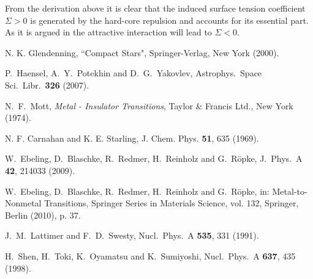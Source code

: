 \documentclass[12pt]{article}
\begin{document}
From the derivation above 
it is clear  that the induced surface tension coefficient $\Sigma > 0$ is generated by the hard-core repulsion and  accounts for its 
essential  part. As it  is argued in \cite{Bugaev:13NPA} the attractive interaction will lead to $\Sigma < 0$.


\begin{thebibliography}{99}

N. K.  Glendenning, ``Compact Stars", Springer-Verlag, New York   (2000). 


  P.~Haensel, A.~Y.~Potekhin and D.~G.~Yakovlev,
  Astrophys.\ Space Sci.\ Libr.\  {\bf 326} (2007).

N.~F.~Mott, {\it Metal - Insulator Transitions}, Taylor \& Francis Ltd., New York (1974).  

N. F. Carnahan and  K. E. Starling, J. Chem. Phys. {\bf  51}, 635  (1969).


  W.~Ebeling, D.~Blaschke, R.~Redmer, H.~Reinholz and G.~R\"opke,
  J.\ Phys.\ A {\bf 42}, 214033 (2009).

  W.~Ebeling, D.~Blaschke, R.~Redmer, H.~Reinholz and G.~R\"opke,
  in: Metal-to-Nonmetal Transitions, Springer Series in Materials Science, vol. 132, 
  Springer, Berlin (2010), p. 37.


  J.~M.~Lattimer and F.~D.~Swesty,
  Nucl.\ Phys.\ A {\bf 535}, 331 (1991).

  H.~Shen, H.~Toki, K.~Oyamatsu and K.~Sumiyoshi,
  Nucl.\ Phys.\ A {\bf 637}, 435 (1998).


\end{thebibliography}
\end{document}
